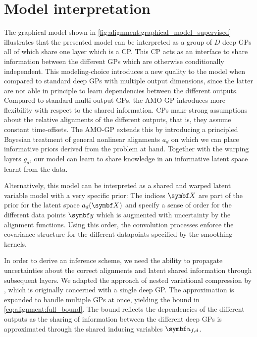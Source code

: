 \section{Model interpretation}
\label{toc:alignment:interpretation}
The graphical model shown in \cref{fig:alignment:graphical_model_supervised} illustrates that the presented model can be interpreted as a group of $D$ deep GPs all of which share one layer which is a CP.
This CP acts as an interface to share information between the different GPs which are otherwise conditionally independent.
This modeling-choice introduces a new quality to the model when compared to standard deep GPs with multiple output dimensions, since the latter are not able in principle to learn dependencies between the different outputs.
Compared to standard multi-output GPs, the AMO-GP introduces more flexibility with respect to the shared information.
CPs make strong assumptions about the relative alignments of the different outputs, that is, they assume constant time-offsets.
The AMO-GP extends this by introducing a principled Bayesian treatment of general nonlinear alignments $a_d$ on which we can place informative priors derived from the problem at hand.
Together with the warping layers $g_d$, our model can learn to share knowledge in an informative latent space learnt from the data.

Alternatively, this model can be interpreted as a shared and warped latent variable model with a very specific prior:
The indices $\mat{X}$ are part of the prior for the latent space $a_d(\mat{X})$ and specify a sense of order for the different data points $\mat{y}$ which is augmented with uncertainty by the alignment functions.
Using this order, the convolution processes enforce the covariance structure for the different datapoints specified by the smoothing kernels.

In order to derive an inference scheme, we need the ability to propagate uncertainties about the correct alignments and latent shared information through subsequent layers.
We adapted the approach of nested variational compression by \textcite{hensman_nested_2014}, which is originally concerned with a single deep GP.
The approximation is expanded to handle multiple GPs at once, yielding the bound in \cref{eq:alignment:full_bound}.
The bound reflects the dependencies of the different outputs as the sharing of information between the different deep GPs is approximated through the shared inducing variables $\rv{u}_{f,d}$.


